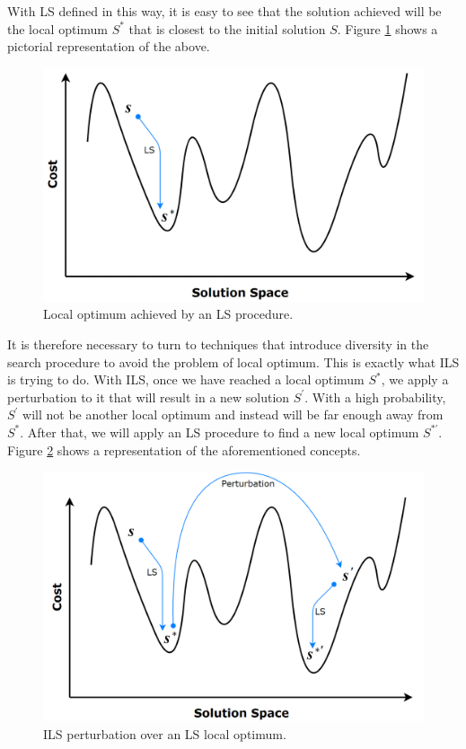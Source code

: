 With \acs{LS} defined in this way, it is easy to see that the solution achieved will be the local optimum $S^*$ that is closest to the initial solution $S$. Figure \ref{img:LS} shows a pictorial representation of the above.

\begin{figure}[!h]
	\centering
	\includegraphics[scale=0.25]{gfx/NewProp/DILS/LS.png}
	\caption{Local optimum achieved by an \acs{LS} procedure.}\label{img:LS}
\end{figure}

It is therefore necessary to turn to techniques that introduce diversity in the search procedure to avoid the problem of local optimum. This is exactly what \acs{ILS} is trying to do. With \acs{ILS}, once we have reached a local optimum $S^*$, we apply a perturbation to it that will result in a new solution $S^\prime$. With a high probability, $S^\prime$ will not be another local optimum and instead will be far enough away from $S^*$. After that, we will apply an \acs{LS} procedure to find a new local optimum $S^{*\prime}$. Figure \ref{img:ILS} shows a representation of the aforementioned concepts.

\begin{figure}[!h]
	\centering
	\includegraphics[scale=0.25]{gfx/NewProp/DILS/ILS.png}
	\caption{\acs{ILS} perturbation over an \acs{LS} local optimum.}\label{img:ILS}
\end{figure}

